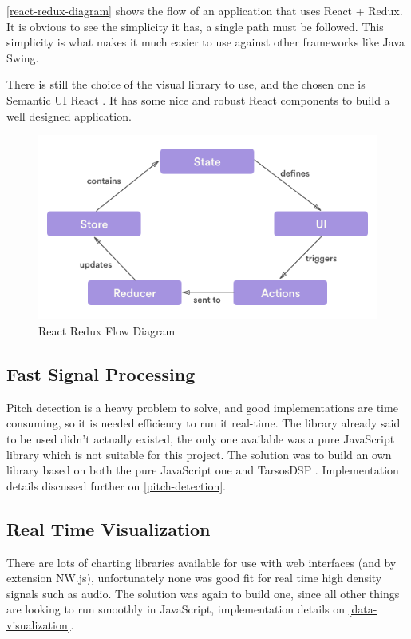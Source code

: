 \autoref{react-redux-diagram} shows the flow of an application that uses
React + Redux. It is obvious to see the simplicity it has, a single path must be followed.
This simplicity is what makes it much easier to use against other frameworks like
Java Swing. 

There is still the choice of the visual library to use, and the chosen one is
Semantic UI React \cite{semantic-ui}. It has some nice and robust React components
to build a well designed application.

\begin{figure}[htb]
  \centering
  \caption{React Redux Flow Diagram}
  \label{react-redux-diagram}
  \includegraphics[scale=0.5]{images/react-redux-diagram}
\end{figure}

\subsection{Fast Signal Processing}
Pitch detection is a heavy problem to solve, and good implementations are time
consuming, so it is needed efficiency to run it real-time. The library already said
to be used didn't actually existed, the only one available was a pure JavaScript
library \cite{pitchfinder} which is not suitable for this project. The solution
was to build an own library based on both the pure JavaScript one and TarsosDSP
\cite{TarsosDSP}. Implementation details discussed further on \autoref{pitch-detection}.

\subsection{Real Time Visualization}
There are lots of charting libraries available for use with web interfaces (and
by extension NW.js), unfortunately none was good fit for real time high density
signals such as audio. The solution was again to build one, since all other things
are looking to run smoothly in JavaScript, implementation details on \autoref{data-visualization}.
